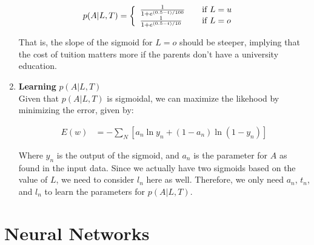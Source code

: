 \documentclass{article}
\begin{document}
\begin{enumerate}
  \begin{align*}
    p(A|L,T) &= \left\{
    \begin{array}{l l}
      \frac{1}{1 + e^{(0.5 - t)/100}} & \quad \text{if $L = u$}\\
      \frac{1}{1 + e^{(0.5 - t)/10}} & \quad \text{if $L = o$}\\
    \end{array} \right.
  \end{align*}

  That is, the slope of the sigmoid for $L = o$ should be steeper,
  implying that the cost of tuition matters more if the parents
  don't have a university education.
  
\item \textbf{Learning} $p(A|L,T)$\\
  Given that $p(A|L,T)$ is sigmoidal, we can maximize the likehood by
  minimizing the error, given by:

  \begin{align*}
    E(w) &= -\sum_N[a_n\ln y_n + (1 - a_n)\ln(1-y_n)]
  \end{align*}

  Where $y_n$ is the output of the sigmoid, and $a_n$ is the parameter
  for $A$ as found in the input data. Since we actually have two sigmoids
  based on the value of $L$, we need to consider $l_n$ here as well.
  Therefore, we only need $a_n$, $t_n$, and $l_n$ to learn the parameters
  for $p(A|L,T)$.

\end{enumerate}

\section{Neural Networks}
\end{document}
